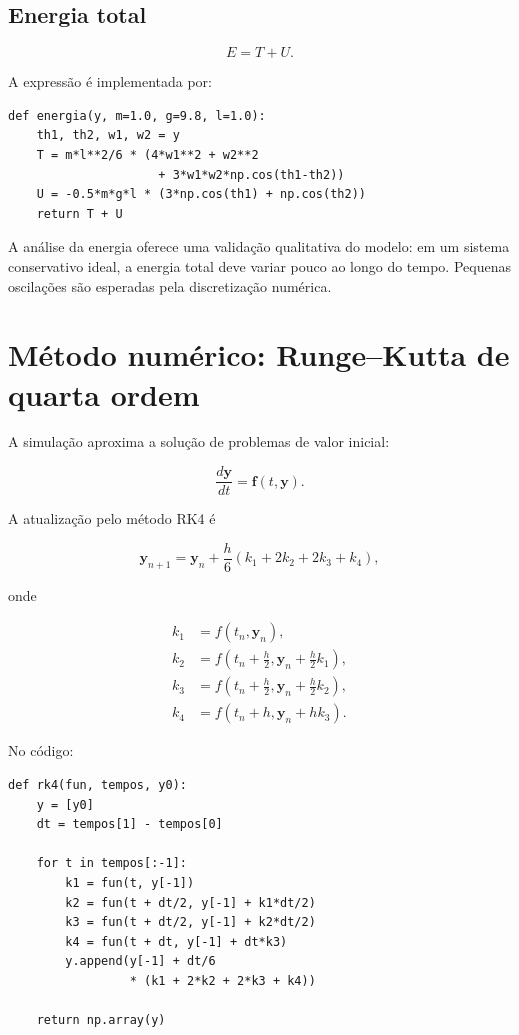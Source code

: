 \documentclass[12pt,a4paper]{article}
\begin{document}
\subsection{Energia total}

\begin{equation}
E = T + U.
\end{equation}

A expressão é implementada por:

\begin{lstlisting}
def energia(y, m=1.0, g=9.8, l=1.0):
    th1, th2, w1, w2 = y
    T = m*l**2/6 * (4*w1**2 + w2**2
                     + 3*w1*w2*np.cos(th1-th2))
    U = -0.5*m*g*l * (3*np.cos(th1) + np.cos(th2))
    return T + U
\end{lstlisting}

A análise da energia oferece uma validação qualitativa do modelo: em um sistema conservativo ideal, a energia total deve variar pouco ao longo do tempo. Pequenas oscilações são esperadas pela discretização numérica.

\section{Método numérico: Runge--Kutta de quarta ordem}

A simulação aproxima a solução de problemas de valor inicial:

\begin{equation}
\frac{d\mathbf{y}}{dt}=\mathbf{f}(t,\mathbf{y}).
\end{equation}

A atualização pelo método RK4 é

\begin{equation}
\mathbf{y}_{n+1}=\mathbf{y}_n+
\frac{h}{6}(k_1+2k_2+2k_3+k_4),
\end{equation}

onde

\begin{align}
k_1 &= f(t_n,\mathbf{y}_n),\\
k_2 &= f\left(t_n+\frac{h}{2},\mathbf{y}_n+\frac{h}{2}k_1\right),\\
k_3 &= f\left(t_n+\frac{h}{2},\mathbf{y}_n+\frac{h}{2}k_2\right),\\
k_4 &= f(t_n+h,\mathbf{y}_n+hk_3).
\end{align}

No código:

\begin{lstlisting}
def rk4(fun, tempos, y0):
    y = [y0]
    dt = tempos[1] - tempos[0]

    for t in tempos[:-1]:
        k1 = fun(t, y[-1])
        k2 = fun(t + dt/2, y[-1] + k1*dt/2)
        k3 = fun(t + dt/2, y[-1] + k2*dt/2)
        k4 = fun(t + dt, y[-1] + dt*k3)
        y.append(y[-1] + dt/6
                 * (k1 + 2*k2 + 2*k3 + k4))

    return np.array(y)
\end{lstlisting}
\end{document}
